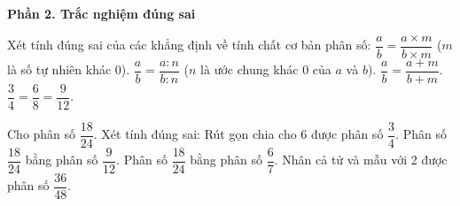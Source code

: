 \textbf{Phần 2. Trắc nghiệm đúng sai}

\begin{ex} %
Xét tính đúng sai của các khẳng định về tính chất cơ bản phân số:
\choiceTF
{\True $\dfrac{a}{b} = \dfrac{a \times m}{b \times m}$ ($m$ là số tự nhiên khác 0).}
{\True $\dfrac{a}{b} = \dfrac{a : n}{b : n}$ ($n$ là ước chung khác 0 của $a$ và $b$).}
{$\dfrac{a}{b} = \dfrac{a + m}{b + m}$.}
{\True $\dfrac{3}{4} = \dfrac{6}{8} = \dfrac{9}{12}$.}
\end{ex}

\begin{ex} %
Cho phân số $\dfrac{18}{24}$. Xét tính đúng sai:
\choiceTF
{\True Rút gọn chia cho 6 được phân số $\dfrac{3}{4}$.}
{\True Phân số $\dfrac{18}{24}$ bằng phân số $\dfrac{9}{12}$.}
{Phân số $\dfrac{18}{24}$ bằng phân số $\dfrac{6}{7}$.}
{\True Nhân cả tử và mẫu với 2 được phân số $\dfrac{36}{48}$.}
\end{ex}

